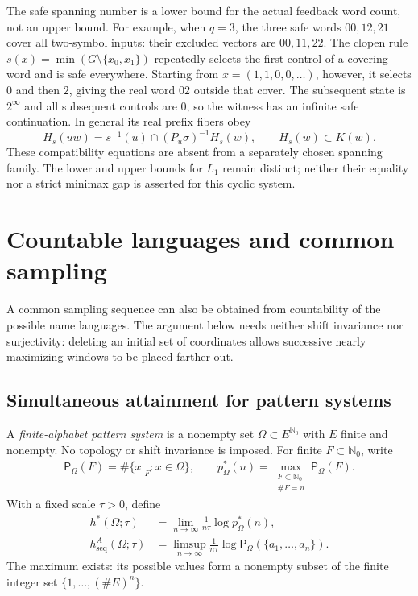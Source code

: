 \documentclass[11pt,reqno]{amsart}
\numberwithin{equation}{section}
\theoremstyle{definition}
\newcommand{\Nzero}{\mathbb N_0}
\newcommand{\Patt}{\mathsf P}
\newcommand{\hseq}{h_{\mathrm{seq}}}
\newcommand{\hpat}{h^{*}}
\begin{document}
The safe spanning number is a lower bound for the actual feedback
word count, not an upper bound. For example, when $q=3$, the
three safe words $00,12,21$ cover all two-symbol inputs: their
excluded vectors are $00,11,22$. The clopen rule
$s(x)=\min(G\setminus\{x_0,x_1\})$ repeatedly selects the
first control of a covering word and is safe everywhere.
Starting from $x=(1,1,0,0,\ldots)$, however, it selects $0$
and then $2$, giving the real word $02$ outside that cover.
The subsequent state is $2^\infty$ and all subsequent controls
are $0$, so the witness has an infinite safe continuation.
In general its real prefix fibers obey
\[
 H_s(uw)=s^{-1}(u)\cap(P_u\sigma)^{-1}H_s(w),
 \qquad H_s(w)\subset K(w).
\]
These compatibility equations are absent from a separately
chosen spanning family. The lower and upper bounds for $L_1$
remain distinct; neither their equality nor a strict minimax
gap is asserted for this cyclic system.


\section{Countable languages and common sampling}\label{sec:comb}

A common sampling sequence can also be obtained from countability
of the possible name languages. The argument below needs neither
shift invariance nor surjectivity: deleting an initial set of
coordinates allows successive nearly maximizing windows to be
placed farther out.

\subsection{Simultaneous attainment for pattern systems}

A \emph{finite-alphabet pattern system} is a nonempty set
$\Omega\subset E^{\Nzero}$ with $E$ finite and nonempty.  No topology or
shift invariance is imposed.  For finite $F\subset\Nzero$, write
\begin{align*}
 \Patt_\Omega(F)=\#\{x|_F:x\in\Omega\},
 \qquad
 p_\Omega^*(n)=
 \max_{\substack{F\subset\Nzero\\\#F=n}}\Patt_\Omega(F).
\end{align*}
With a fixed scale $\tau>0$, define
\begin{align*}
 \hpat(\Omega;\tau)&=\lim_{n\to\infty}
       \frac1{n\tau}\log p_\Omega^*(n),\\
 \hseq^A(\Omega;\tau)&=\limsup_{n\to\infty}
       \frac1{n\tau}\log
       \Patt_\Omega(\{a_1,\ldots,a_n\}).
\end{align*}
The maximum exists: its possible values form a nonempty subset of the finite
integer set $\{1,\ldots,(\#E)^n\}$.
\end{document}
